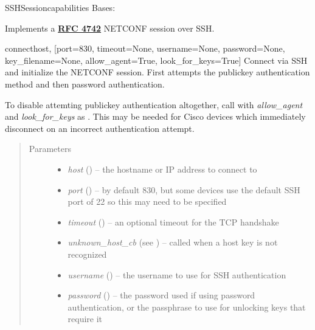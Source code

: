 \documentclass[a4paper,10pt,english]{manual}
\begin{document}
\hypertarget{ncclient.transport.SSHSession}{}\begin{classdesc}{SSHSession}{capabilities}
Bases: 

Implements a \href{http://tools.ietf.org/html/rfc4742.html}{\textbf{RFC 4742}} NETCONF session over SSH.

\hypertarget{ncclient.transport.SSHSession.connect}{}\begin{methoddesc}{connect}{host, {[}port=830, timeout=None, username=None, password=None, key\_filename=None, allow\_agent=True, look\_for\_keys=True{]}}
Connect via SSH and initialize the NETCONF session. First attempts
the publickey authentication method and then password authentication.

To disable attemting publickey authentication altogether, call with
\emph{allow\_agent} and \emph{look\_for\_keys} as \href{http://docs.python.org/library/constants.html\#False}{}. This may be needed
for Cisco devices which immediately disconnect on an incorrect
authentication attempt.
\begin{quote}\begin{description}
\item[Parameters]\begin{itemize}
\item {} 
\emph{host} (\href{http://docs.python.org/library/string.html\#string}{}) -- the hostname or IP address to connect to

\item {} 
\emph{port} (\href{http://docs.python.org/library/functions.html\#int}{}) -- by default 830, but some devices use the default SSH port of 22 so this may need to be specified

\item {} 
\emph{timeout} (\href{http://docs.python.org/library/functions.html\#int}{}) -- an optional timeout for the TCP handshake

\item {} 
\emph{unknown\_host\_cb} (see \hyperlink{ncclient.transport.ssh.default_unknown_host_cb}{}) -- called when a host key is not recognized

\item {} 
\emph{username} (\href{http://docs.python.org/library/string.html\#string}{}) -- the username to use for SSH authentication

\item {} 
\emph{password} (\href{http://docs.python.org/library/string.html\#string}{}) -- the password used if using password authentication, or the passphrase to use for unlocking keys that require it


\end{itemize}
\end{description}
\end{quote}
\end{methoddesc}
\end{classdesc}
\end{document}
